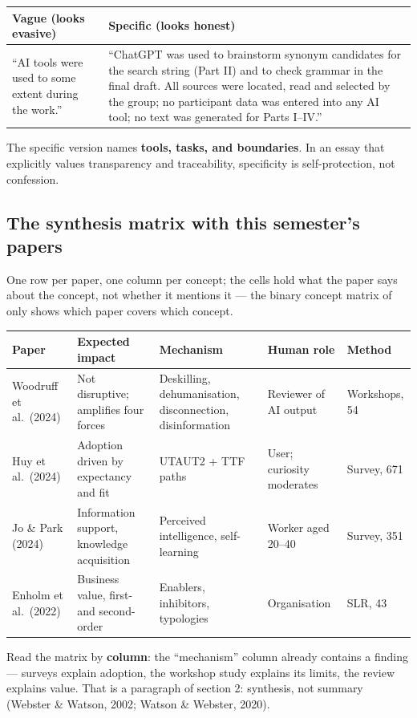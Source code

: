 \documentclass[11pt,a4paper,british,twoside=false,headings=small,chapterprefix=false,numbers=noenddot]{scrbook}
\begin{document}
\begin{center}\small
\small
  \renewcommand{\arraystretch}{1.4}
  \begin{tabular}{@{}p{5.8cm}p{7.0cm}@{}}
    \toprule
    \textbf{Vague (looks evasive)} & \textbf{Specific (looks honest)}\\
    \midrule
    ``AI tools were used to some extent during the work.'' & ``ChatGPT was used to brainstorm synonym candidates for the search string (Part II) and to check grammar in the final draft. All sources were located, read and selected by the group; no participant data was entered into any AI tool; no text was generated for Parts I--IV.''\\
    \bottomrule
  \end{tabular}
  

  The specific version names \textbf{tools, tasks, and boundaries}. In an
  essay that explicitly values transparency and traceability, specificity is
  self-protection, not confession.
\end{center}


\subsection{The synthesis matrix with this semester's papers}
\begin{center}\small
\small One row per paper, one column per concept; the cells hold what the
  paper says about the concept, not whether it mentions it --- the binary
  concept matrix of  only shows which
  paper covers which concept.
  
  \footnotesize
  \renewcommand{\arraystretch}{1.15}
  \begin{tabular}{@{}p{2.7cm}p{2.3cm}p{2.5cm}p{2.4cm}p{2.1cm}@{}}
    \toprule
    \textbf{Paper} & \textbf{Expected impact} & \textbf{Mechanism} & \textbf{Human role} & \textbf{Method}\\
    \midrule
    Woodruff et al.\ (2024) & Not disruptive; amplifies four forces & Deskilling, dehumanisation, disconnection, disinformation & Reviewer of AI output & Workshops, 54\\
    Huy et al.\ (2024) & Adoption driven by expectancy and fit & UTAUT2 + TTF paths & User; curiosity moderates & Survey, 671\\
    Jo \& Park (2024) & Information support, knowledge acquisition & Perceived intelligence, self-learning & Worker aged 20--40 & Survey, 351\\
    Enholm et al.\ (2022) & Business value, first- and second-order & Enablers, inhibitors, typologies & Organisation & SLR, 43\\
    \bottomrule
  \end{tabular}
  

  \small Read the matrix by \textbf{column}: the ``mechanism'' column already
  contains a finding --- surveys explain adoption, the workshop study explains
  its limits, the review explains value. That is a paragraph of section 2:
  synthesis, not summary (Webster \& Watson, 2002; Watson \& Webster, 2020).
\end{center}
\end{document}
